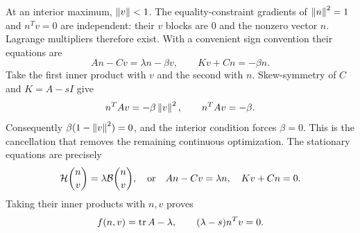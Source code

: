 At an interior maximum, $\left\lVert v\right\rVert<1$. The equality-constraint gradients of $\left\lVert n\right\rVert^2=1$ and $n^Tv=0$ are independent: their $v$ blocks are $0$ and the nonzero vector $n$. Lagrange multipliers therefore exist. With a convenient sign convention their equations are
\begin{equation}
 An-Cv=\lambda n-\beta v,\qquad Kv+Cn=-\beta n.
 \label{eq:kkt}
\end{equation}
Take the first inner product with $v$ and the second with $n$. Skew-symmetry of $C$ and $K=A-sI$ give
\begin{equation}
 n^TAv=-\beta\left\lVert v\right\rVert^2,\qquad n^TAv=-\beta.
\end{equation}
Consequently $\beta(1-\left\lVert v\right\rVert^2)=0$, and the interior condition forces $\beta=0$. This is the cancellation that removes the remaining continuous optimization. The stationary equations are precisely
\begin{equation}
 \mathcal H\binom n v=\lambda\mathcal B\binom n v,
 \quad\text{or}\quad An-Cv=\lambda n,\quad Kv+Cn=0.
 \label{eq:stationary}
\end{equation}
Taking their inner products with $n,v$ proves
\begin{equation}
 f(n,v)=\operatorname{tr} A-\lambda,
 \qquad (\lambda-s)n^Tv=0.
 \label{eq:stationaryvalue}
\end{equation}
